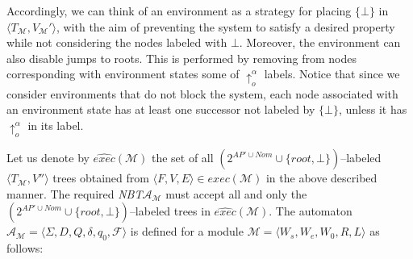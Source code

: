 \documentclass{LMCS}
\theoremstyle{plain}
\def \A             {\mathcal{A}}
\def \edge          {E}
\def \F             {\mathcal{F}}
\def \M             {\mathcal{M}}
\def \NBT           {\emph{NBT}\xspace}
\def \node          {V}
\def \rr            {\mathit{root}}
\newcommand \tpl[1] {\langle #1 \rangle}
\begin{document}
Accordingly, we can think of an environment as a strategy for placing
$\{\bot\}$ in $\tpl{T_{\M},\node_{\M}'}$, with the aim of preventing the system
to satisfy a desired property while not considering the nodes labeled with
$\bot$. Moreover, the environment can also disable jumps to roots. This is
performed by removing from nodes corresponding with environment states some of
$\uparrow_o^{\alpha}$ labels. Notice that since we consider environments that
do not block the system, each node associated with an environment state has at
least one successor not labeled by $\{\bot\}$, unless it has
$\uparrow_o^{\alpha}$ in its label.

Let us denote by $\widehat{exec}(\M)$ the set of all $(2^{AP' \cup Nom} \cup
\{\rr,\bot\})$--labeled $\tpl{T_{\M},\node''}$ trees obtained from
$\tpl{F,\node,\edge} \in exec(\M)$ in the above described manner. The required
\NBT $\A_{\M}$ must accept all and only the $(2^{AP' \cup Nom} \cup
\{\rr,\bot\})$--labeled trees in $\widehat{exec}(\M)$. The automaton
$\A_{\M}=\tpl{\Sigma, D, Q, \delta, q_0, \F}$ is defined for a module $\M =
\tpl{W_s, W_e,W_0, R, L}$  as follows:
\end{document}
